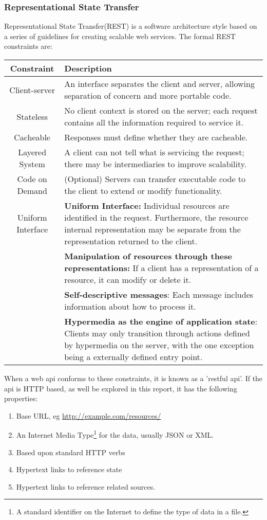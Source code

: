 \subsubsection{Representational State Transfer}
Representational State Transfer(REST) is a software architecture style based on a series of guidelines for creating scalable web services\cite{rest}. The formal REST constraints are:  

\begin{center}
\begin{tabular}{| c | p{10cm} |}
\hline
\textbf{Constraint} & \textbf{Description} \\ \hline
Client-server & An interface separates the client and server, allowing separation of concern and more portable code. \\ \hline
Stateless & No client context is stored on the server; each request contains all the information required to service it. \\ \hline
Cacheable & Responses must define whether they are cacheable. \\ \hline
Layered System & A client can not tell what is servicing the request; there may be intermediaries to improve scalability.\\ \hline
Code on Demand & (Optional) Servers can transfer executable code to the client to extend or modify functionality.\\ \hline
Uniform Interface
& \textbf{Uniform Interface:} Individual resources are identified in the request. Furthermore, the resource internal representation may be separate from the representation returned to the client. \\ \cline{2-2}
& \textbf{Manipulation of resources through these representations:} If a client has a representation of a resource, it can modify or delete it. \\ \cline{2-2}
& \textbf{Self-descriptive messages}: Each message includes information about how to process it. \\ \cline{2-2}
& \textbf{Hypermedia as the engine of application state}: Clients may only transition through actions defined by hypermedia on the server, with the one exception being a externally defined entry point. \\ \hline
\end{tabular}
\end{center}

When a web api conforms to these constraints, it is known as a 'restful api'. If the api is HTTP based, as well be explored in this report, it has the following properties:
\begin{enumerate}
	\setlength{\itemsep}{0pt}
	\item Base URL, eg \url{http://example.com/resources/}
	\item An Internet Media Type\footnote{A standard identifier on the Internet to define the type of data in a file.}\cite{internetmedia} for the data, usually JSON or XML.
	\item Based upon standard HTTP verbs
	\item Hypertext links to reference state
	\item Hypertext links to reference related sources.
\end{enumerate}

